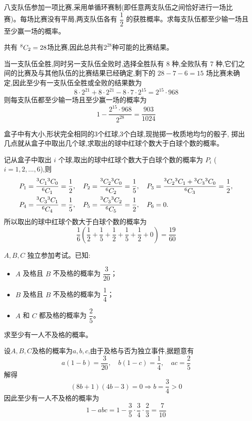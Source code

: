 \begin{questions}
    \question 八支队伍参加一项比赛,采用单循环赛制(即任意两支队伍之间恰好进行一场比赛)。每场比赛没有平局,两支队伍各有 $\dfrac{1}{2}$ 的获胜概率。求每支队伍都至少输一场且至少赢一场的概率。
    \begin{solution}
        共有 ${}^{8}C_{2}= 28$场比赛,因此总共有$2^{28}$种可能的比赛结果。

        当一支队伍全胜,同时另一支队伍全败时,选择全胜队有 8 种,全败队有 7 种,它们之间的比赛及与其他队伍的比赛结果已经确定,剩下的 $28-7-6=15$ 场比赛未确定,因此至少有一支队伍全胜或全败的结果数为
        \[
        8 \cdot 2^{21} + 8 \cdot 2^{21} - 8 \cdot 7 \cdot 2^{15}=2^{15}\cdot 968
        \]
        则每支队伍都至少输一场且至少赢一场的概率为
        \[
        1 - \frac{2^{15}\cdot 968}{2^{28}}  = \frac{903}{1024}
        \]
    \end{solution}

    \question 盒子中有大小,形状完全相同的3个红球,3个白球,现抛掷一枚质地均匀的骰子, 掷出几点就从盒子中取出几个球,求取出的球中红球个数大于白球个数的概率。
    \begin{solution}
        记从盒子中取出 $i$ 个球,取出的球中红球个数大于白球个数的概率为 $P_i$ ($i=1, 2, ..., 6$),则 
        \[
        \begin{aligned}
        P_1 &= \frac{{}^{3}C_{1}{}^{3}C_{0}}{{}^{6}C_{1}} = \frac{1}{2}, \quad
        P_2 = \frac{{}^{3}C_{2} {}^{3}C_{0}}{{}^{6}C_{2}} = \frac{1}{5}, \quad
        P_3 = \frac{{}^{3}C_{2}{}^{3}C_{1} + {}^{3}C_{3}{}^{3}C_{0}}{{}^{6}C_{3}}  = \frac{1}{2}, \\
        P_4 &= \frac{{}^{3}C_{3} {}^{3}C_{1}}{{}^{6}C_{4}} = \frac{1}{5}, \quad
        P_5 = \frac{{}^{3}C_{3} {}^{3}C_{2}}{{}^{6}C_{5}} = \frac{1}{2}, \quad
        P_6 = 0.
        \end{aligned}
        \]
        所以取出的球中红球个数大于白球个数的概率为 $$\frac{1}{6}\left(\frac{1}{2}+\frac{1}{5}+\frac{1}{2}+\frac{1}{5}+\frac{1}{2}+0\right)=\frac{19}{60}$$
    \end{solution}

    \question $A,B,C$ 独立参加考试。已知:
    \begin{itemize}
        \item $A$ 及格且 $B$ 不及格的概率为 $\dfrac{3}{20}$；
        \item $B$ 及格且 $B$ 不及格的概率为 $\dfrac{1}{4}$；
        \item $A$ 和 $C$ 都及格的概率为 $\dfrac{2}{5}$。
    \end{itemize}
    求至少有一人不及格的概率。
    \begin{solution}
        设$A,B,C$及格的概率为$a,b,c$,由于及格与否为独立事件,据题意有
        \[
        a(1-b) = \frac{3}{20}, \quad b(1-c) = \frac{1}{4}, \quad ac = \frac{2}{5}
        \]
        解得
        \[
        (8b+1)(4b-3) = 0 \Rightarrow b = \frac{3}{4} >0
        \]
        因此至少有一人不及格的概率为
        \[
        1 - abc  = 1 - \frac{3}{5} \cdot \frac{3}{4} \cdot \frac{2}{3}= \frac{7}{10}
        \]
    \end{solution}


\end{questions}
